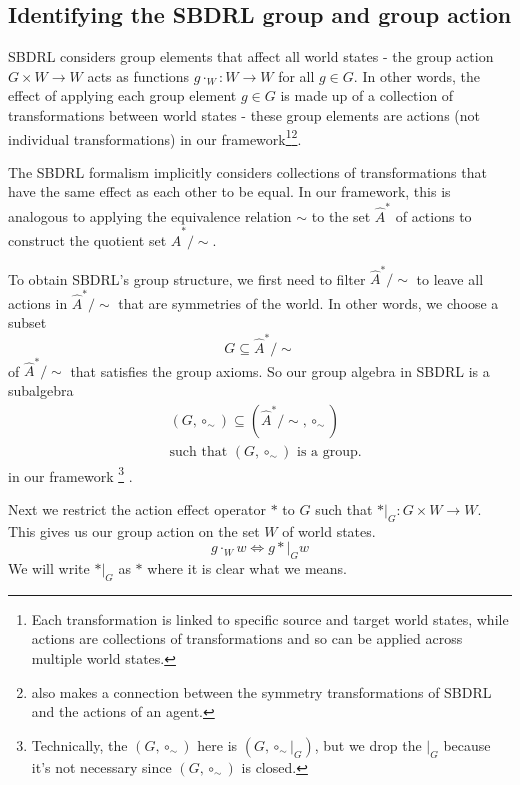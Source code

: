\subsection{Identifying the SBDRL group and group action}

SBDRL considers group elements that affect all world states - the group action $G \times W \to W$ acts as functions $g \cdot_{W}: W \to W$ for all $g \in G$.
In other words, the effect of applying each group element $g \in G$ is made up of a collection of transformations between world states - these group elements are actions (not individual transformations) in our framework\footnote{
Each transformation is linked to specific source and target world states, while actions are collections of transformations and so can be applied across multiple world states.
}\footnote{
\autocite{caselles2019symmetry} also makes a connection between the symmetry transformations of SBDRL and the actions of an agent.
}.

The SBDRL formalism implicitly considers collections of transformations that have the same effect as each other to be equal.
In our framework, this is analogous to applying the equivalence relation $\sim$ to the set $\hat{A}^{*}$ of actions to construct the quotient set $\hat{A}^{*}/\sim$.

To obtain SBDRL's group structure, we first need to filter $\hat{A}^{*}/\sim$ to leave all actions in $\hat{A}^{*}/\sim$ that are symmetries of the world.
In other words, we choose a subset
\begin{equation}
    G \subseteq \hat{A}^{*}/\sim
\end{equation}
 of $\hat{A}^{*}/\sim$ that satisfies the group axioms.
 So our group algebra in SBDRL is a subalgebra
 \begin{equation}
 \begin{aligned}
     & (G, \circ_{\sim}) \subseteq (\hat{A}^{*}/\sim, \circ_{\sim}) \\
     & \text{such that } (G, \circ_{\sim}) \text{ is a group.}
 \end{aligned}
 \end{equation}
 in our framework
 \footnote{Technically, the $(G, \circ_{\sim})$ here is $(G, \circ_{\sim}|_{G})$, but we drop the $|_{G}$ because it's not necessary since $(G, \circ_{\sim})$ is closed.}
 .

Next we restrict the action effect operator $\ast$ to $G$ such that $\ast|_{G} : G \times W \to W$.
This gives us our group action on the set $W$ of world states.
\begin{equation}
    g \cdot_{W} w \iff g \ast|_{G} w
\end{equation}
We will write $\ast|_{G}$ as $\ast$ where it is clear what we means.

